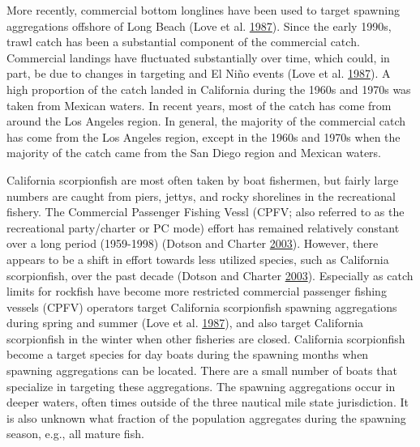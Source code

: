 \documentclass[12pt,]{article}
\begin{document}
More recently, commercial bottom longlines have been used to target
spawning aggregations offshore of Long Beach (Love et al.
\protect\hyperlink{ref-Love1987}{1987}). Since the early 1990s, trawl
catch has been a substantial component of the commercial catch.
Commercial landings have fluctuated substantially over time, which
could, in part, be due to changes in targeting and El
\(\text{Ni\~{n}o}\) events (Love et al.
\protect\hyperlink{ref-Love1987}{1987}). A high proportion of the catch
landed in California during the 1960s and 1970s was taken from Mexican
waters. In recent years, most of the catch has come from around the Los
Angeles region. In general, the majority of the commercial catch has
come from the Los Angeles region, except in the 1960s and 1970s when the
majority of the catch came from the San Diego region and Mexican waters.

California scorpionfish are most often taken by boat fishermen, but
fairly large numbers are caught from piers, jettys, and rocky shorelines
in the recreational fishery. The Commercial Passenger Fishing Vessl
(CPFV; also referred to as the recreational party/charter or PC mode)
effort has remained relatively constant over a long period (1959-1998)
(Dotson and Charter \protect\hyperlink{ref-Dotson2003}{2003}). However,
there appears to be a shift in effort towards less utilized species,
such as California scorpionfish, over the past decade (Dotson and
Charter \protect\hyperlink{ref-Dotson2003}{2003}). Especially as catch
limits for rockfish have become more restricted commercial passenger
fishing vessels (CPFV) operators target California scorpionfish spawning
aggregations during spring and summer (Love et al.
\protect\hyperlink{ref-Love1987}{1987}), and also target California
scorpionfish in the winter when other fisheries are closed. California
scorpionfish become a target species for day boats during the spawning
months when spawning aggregations can be located. There are a small
number of boats that specialize in targeting these aggregations. The
spawning aggregations occur in deeper waters, often times outside of the
three nautical mile state jurisdiction. It is also unknown what fraction
of the population aggregates during the spawning season, e.g., all
mature fish.
\end{document}
